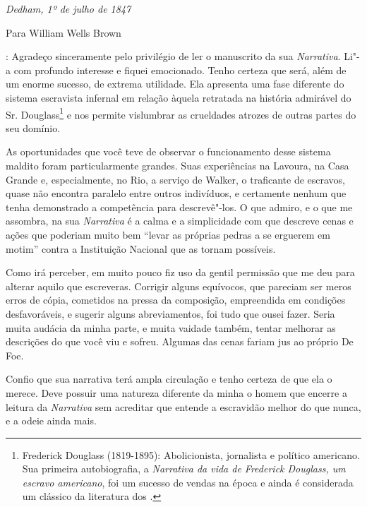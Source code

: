 \begin{flushright}
\emph{Dedham, 1º de julho de 1847}
\end{flushright}

\begin{flushleft}
Para William Wells Brown
\end{flushleft}

: Agradeço sinceramente pelo privilégio de ler o
manuscrito da sua \emph{Narrativa}. Li"-a com profundo interesse e fiquei
emocionado. Tenho certeza que será, além de um enorme sucesso, de
extrema utilidade. Ela apresenta uma fase diferente do sistema
escravista infernal em relação àquela retratada na história admirável do
Sr. Douglass\footnote{Frederick Douglass (1819-1895): Abolicionista,
  jornalista e político americano. Sua primeira autobiografia, a
  \emph{Narrativa da vida de Frederick Douglass, um escravo americano},
  foi um sucesso de vendas na época e ainda é considerada um clássico da
  literatura dos .} e nos permite vislumbrar as crueldades atrozes de
outras partes do seu domínio.

As oportunidades que você teve de observar o funcionamento desse sistema
maldito foram particularmente grandes. Suas experiências na Lavoura, na
Casa Grande e, especialmente, no Rio, a serviço de Walker, o traficante
de escravos, quase não encontra paralelo entre outros indivíduos, e
certamente nenhum que tenha demonstrado a competência para descrevê"-los.
O que admiro, e o que me assombra, na sua \emph{Narrativa} é a calma e a
simplicidade com que descreve cenas e ações que poderiam muito bem
``levar as próprias pedras a se erguerem em motim'' contra a Instituição
Nacional que as tornam possíveis.

Como irá perceber, em muito pouco fiz uso da gentil permissão que me deu
para alterar aquilo que escreveras. Corrigir alguns equívocos, que \label{ref1}
pareciam ser meros erros de cópia, cometidos na pressa da composição,
empreendida em condições desfavoráveis, e sugerir alguns abreviamentos,
foi tudo que ousei fazer. Seria muita audácia da minha parte, e muita
vaidade também, tentar melhorar as descrições do que você viu e sofreu.
Algumas das cenas fariam jus ao próprio De Foe.

Confio que sua narrativa terá ampla circulação e tenho certeza de que
ela o merece. Deve possuir uma natureza diferente da minha o homem que
encerre a leitura da \emph{Narrativa} sem acreditar que entende a escravidão
melhor do que nunca, e a odeie ainda mais.


